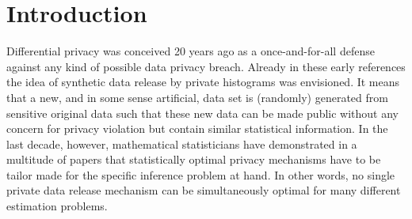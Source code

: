 \documentclass[preprint]{imsart}
\numberwithin{equation}{section}
\newcounter{cond}
\begin{document}
\begin{frontmatter}
\begin{abstract}
We develop plug-in estimators for locally differentially private semi-parametric estimation via spline wavelets. The approach leads to optimal rates of convergence for a large class of estimation problems that are characterized by (differentiable) functionals $\Lambda(f)$ of the true data generating density $f$. The crucial feature of the locally private data $Z_1,\dots, Z_n$ we generate is that it does not depend on the particular functional $\Lambda$ (or the unknown density $f$) the analyst wants to estimate. Hence, the synthetic data can be generated and stored a priori and can subsequently be used by any number of analysts to estimate many vastly different functionals of interest at the provably optimal rate. In principle, this removes a long standing practical limitation in statistics of differential privacy, namely, that optimal privacy mechanisms need to be tailored towards the specific estimation problem at hand.
\end{abstract}

\begin{keyword}[class=MSC]
\end{keyword}

\begin{keyword}
\end{keyword}

\end{frontmatter}

\section{Introduction}

Differential privacy \citep[][]{Dwork06b, Dwork06, Evfim03} was conceived 20 years ago as a once-and-for-all defense against any kind of possible data privacy breach. Already in these early references the idea of synthetic data release by private histograms was envisioned. It means that a new, and in some sense artificial, data set is (randomly) generated from sensitive original data such that these new data can be made public without any concern for privacy violation but contain similar statistical information. In the last decade, however, mathematical statisticians have demonstrated in a multitude of papers \citep[cf.][to mention only a few]{BerrettButucea19,Acharya21,Cai21, ButuceaPrivacy, Duchi17, Lalanne23, Rohde20, Yu23, Steinberger24} that statistically optimal privacy mechanisms have to be tailor made for the specific inference problem at hand. In other words, no single private data release mechanism can be simultaneously optimal for many different  estimation problems.
\end{document}
